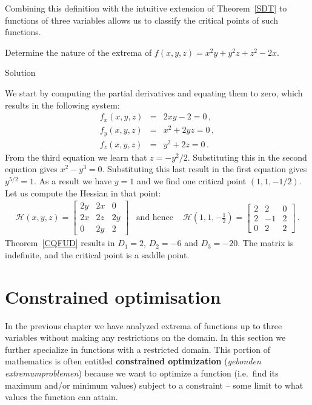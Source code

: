 Combining this definition with the intuitive extension of Theorem~\ref{SDT} to functions of three variables allows us to classify the critical points of such functions. 

\begin{example}
\label{3V}
Determine the nature of the  extrema of $f(x,y,z) = x^2y + y^2z +z^2 -2x$. 

Solution 

We start by computing the partial derivatives and equating them to zero, which results in the following system: 
\begin{eqnarray*}
f_x(x,y,z) &=& 2xy - 2=0\,, \\
f_y(x,y,z) &=& x^2 + 2yz=0\,, \\
f_z(x,y,z) &=& y^2 + 2z=0  \,. 
\end{eqnarray*}
From the third equation we learn that $z = -y^2 / 2$.  Substituting this in the second equation gives $ 
x^2 - y^3 = 0$. Substituting this last result in the first equation gives $y^{5/2}= 1$. As a result we have $y=1$ and we find one critical point $(1,1,-1/2)$. Let us compute the Hessian in that point: 
\begin{eqnarray*}
\mathscr{H}(x,y,z) = \begin{bmatrix} 
2y & 2x & 0 \\ 
2x & 2z  & 2y \\  
0 & 2y & 2
\end{bmatrix} & \mbox{and hence }&  
\mathscr{H}\left(1,1,-\frac{1}{2}\right) =  \begin{bmatrix} 
2 & 2 & 0 \\ 
2 & -1 & 2 \\
0 & 2 & 2
\end{bmatrix} \,. 
\end{eqnarray*}
Theorem~\ref{CQFUD} results in  $D_1 = 2$, $D_2 = -6$ and $D_3 = -20$. The matrix is indefinite, and the critical point is a saddle point. 
\end{example}

\section{Constrained optimisation}
\label{ERD}
In the previous chapter we have analyzed extrema of functions up to three variables without making any restrictions on the domain. In this section we further specialize in functions with a restricted domain. This portion of mathematics is often entitled \textbf{constrained optimization} (\textit{gebonden extremumproblemen}) because we want to optimize a function (i.e.\ find its maximum and/or minimum values) subject to a constraint -- some limit to what values the function can attain. 

